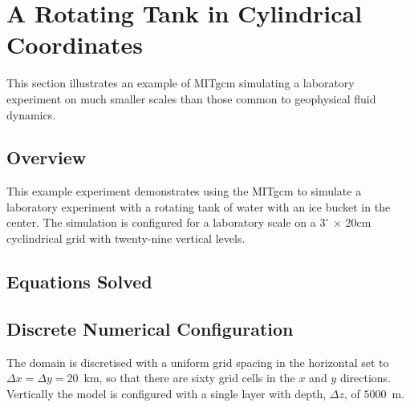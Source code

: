 

%
%

\section{A Rotating Tank in Cylindrical Coordinates}
\label{sect:eg-tank}
\label{www:tutorials}

This section illustrates an example of MITgcm simulating a laboratory
experiment on much smaller scales than those common to geophysical
fluid dynamics.

\subsection{Overview}
\label{www:tutorials}
                                                                                
                                                                                
This example experiment demonstrates using the MITgcm to simulate
a laboratory experiment with a rotating tank of water with an ice
bucket in the center. The simulation is configured for a laboratory
scale on a
$3^{\circ}$ $\times$ 20cm
cyclindrical grid with twenty-nine vertical
levels.
\\



 

\subsection{Equations Solved}
\label{www:tutorials}


\subsection{Discrete Numerical Configuration}
\label{www:tutorials}

 The domain is discretised with 
a uniform grid spacing in the horizontal set to
 $\Delta x=\Delta y=20$~km, so 
that there are sixty grid cells in the $x$ and $y$ directions. Vertically the 
model is configured with a single layer with depth, $\Delta z$, of $5000$~m. 

